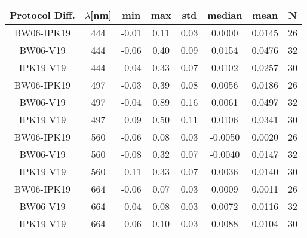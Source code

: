 \documentclass[preview]{standalone}
\begin{document}
\begin{table}
\begin{tabular}{cccccccc}\hline
Protocol Diff. &  $\lambda$[nm] & min & max & std & median & mean & N\\\hline
BW06-IPK19 & 444 & -0.01 & 0.11 & 0.03 & 0.0000 & 0.0145 & 26\\
BW06-V19 & 444 & -0.06 & 0.40 & 0.09 & 0.0154 & 0.0476 & 32\\
IPK19-V19 & 444 & -0.04 & 0.33 & 0.07 & 0.0102 & 0.0257 & 30\\\hline

BW06-IPK19 & 497 & -0.03 & 0.39 & 0.08 & 0.0056 & 0.0186 & 26\\
BW06-V19 & 497 & -0.04 & 0.89 & 0.16 & 0.0061 & 0.0497 & 32\\
IPK19-V19 & 497 & -0.09 & 0.50 & 0.11 & 0.0106 & 0.0341 & 30\\\hline

BW06-IPK19 & 560 & -0.06 & 0.08 & 0.03 & -0.0050 & 0.0020 & 26\\
BW06-V19 & 560 & -0.08 & 0.32 & 0.07 & -0.0040 & 0.0147 & 32\\
IPK19-V19 & 560 & -0.11 & 0.33 & 0.07 & 0.0036 & 0.0140 & 30\\\hline

BW06-IPK19 & 664 & -0.06 & 0.07 & 0.03 & 0.0009 & 0.0011 & 26\\
BW06-V19 & 664 & -0.04 & 0.08 & 0.03 & 0.0072 & 0.0116 & 32\\
IPK19-V19 & 664 & -0.06 & 0.10 & 0.03 & 0.0088 & 0.0104 & 30\\\hline


\end{tabular}
\end{table}
\end{document}
